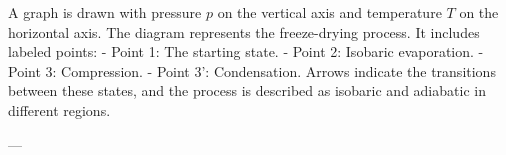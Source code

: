 A graph is drawn with pressure \( p \) on the vertical axis and temperature \( T \) on the horizontal axis. The diagram represents the freeze-drying process. It includes labeled points:  
- Point 1: The starting state.  
- Point 2: Isobaric evaporation.  
- Point 3: Compression.  
- Point 3': Condensation.  
Arrows indicate the transitions between these states, and the process is described as isobaric and adiabatic in different regions.

---